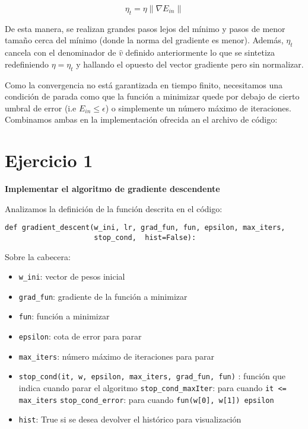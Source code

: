 \begin{equation*}
  \eta_t = \eta \lVert \nabla E_{in} \rVert
\end{equation*}

De esta manera, se realizan grandes pasos lejos del mínimo y pasos de menor tamaño
cerca del mínimo (donde la norma del gradiente es menor).
Además, $\eta_t$ cancela con el denominador de $\hat{v}$ definido anteriormente lo que
se sintetiza redefiniendo $\eta = \eta_t$ y hallando el opuesto del vector gradiente 
pero sin normalizar.

Como la convergencia no está garantizada en tiempo finito, necesitamos una condición de
parada como que la función a minimizar quede por debajo de cierto umbral de
error (i.e $E_{in} \leq \epsilon$) o simplemente un número máximo de iteraciones.
Combinamos ambas en la implementación ofrecida an el archivo de código:

\section{Ejercicio 1}

\textbf{Implementar el algoritmo de gradiente descendente}

Analizamos la definición de la función descrita en el código:

\begin{verbatim}
def gradient_descent(w_ini, lr, grad_fun, fun, epsilon, max_iters, 
                     stop_cond,  hist=False):
\end{verbatim}

Sobre la cabecera:
\begin{itemize}
  \item \texttt{w_ini}: vector de pesos inicial
  \item \texttt{grad_fun}: gradiente de la función a minimizar
  \item \texttt{fun}: función a minimizar
  \item \texttt{epsilon}: cota de error para parar 
  \item \texttt{max_iters}: número máximo de iteraciones para parar
  \item \texttt{stop_cond(it, w, epsilon, max_iters, grad_fun, fun)}
    : función que indica cuando parar el algoritmo
    \subitem \texttt{stop_cond_maxIter}: para cuando \texttt{it <= max_iters}
    \subitem \texttt{stop_cond_error}: para cuando \texttt{fun(w[0], w[1]) \leq epsilon}
  \item \texttt{hist}: True si se desea devolver el histórico para visualización
\end{itemize}


